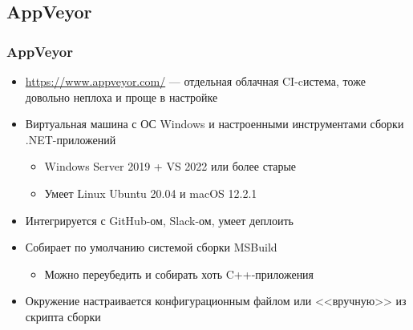\documentclass{../../slides-style}
\begin{document}
    \subsection{AppVeyor}

    \begin{frame}
        \frametitle{AppVeyor}
        \begin{itemize}
            \item \url{https://www.appveyor.com/} --- отдельная облачная CI-cистема, тоже довольно неплоха и проще в настройке
            \item Виртуальная машина с ОС Windows и настроенными инструментами сборки .NET-приложений
            \begin{itemize}
                \item Windows Server 2019 + VS 2022 или более старые
                \item Умеет Linux Ubuntu 20.04 и macOS 12.2.1
            \end{itemize}
            \item Интегрируется с GitHub-ом, Slack-ом, умеет деплоить
            \item Собирает по умолчанию системой сборки MSBuild
            \begin{itemize}
                \item Можно переубедить и собирать хоть C++-приложения
            \end{itemize}
            \item Окружение настраивается конфигурационным файлом или <<вручную>> из скрипта сборки
        \end{itemize}
    \end{frame}
\end{document}
